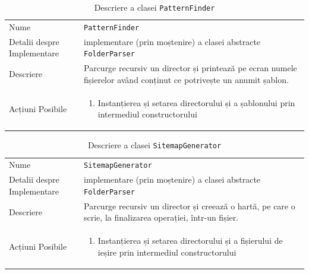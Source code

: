 \documentclass[12pt]{article}
\begin{document}
\newpage

\begin{table}[H]
    \centering
    \begin{tabular}{ |p{0.25\linewidth} | p{0.75\linewidth}| } 
        \hline
        Nume & \texttt{PatternFinder} \\
        Detalii despre Implementare & implementare (prin moștenire) a clasei abstracte \texttt{FolderParser} \\
        Descriere & Parcurge recursiv un director și printează pe ecran numele fișierelor având conținut ce potrivește un anumit șablon. \\
        Acțiuni Posibile & \begin{enumerate}
                               \item Instanțierea și setarea directorului și a șablonului prin intermediul constructorului
                           \end{enumerate} \\
        \hline
    \end{tabular}
    \caption{Descriere a clasei \texttt{PatternFinder}}
    \label{table:1}
\end{table}

\newpage

\begin{table}[H]
    \centering
    \begin{tabular}{ |p{0.25\linewidth} | p{0.75\linewidth}| } 
        \hline
        Nume & \texttt{SitemapGenerator} \\
        Detalii despre Implementare & implementare (prin moștenire) a clasei abstracte \texttt{FolderParser} \\
        Descriere & Parcurge recursiv un director și creează o hartă, pe care o scrie, la finalizarea operației, într-un fișier. \\
        Acțiuni Posibile & \begin{enumerate}
                               \item Instanțierea și setarea directorului și a fișierului de ieșire prin intermediul constructorului
                           \end{enumerate} \\
        \hline
    \end{tabular}
    \caption{Descriere a clasei \texttt{SitemapGenerator}}
    \label{table:1}
\end{table}
\end{document}
